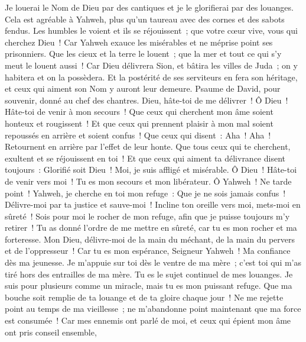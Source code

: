 \begin{multicols}{2}
Je louerai le Nom de Dieu par des cantiques et je le glorifierai par des louanges.
Cela est agréable à Yahweh, plus qu'un taureau avec des cornes et des sabots fendus.
Les humbles le voient et ils se réjouissent~; que votre cœur vive, vous qui cherchez Dieu~!
Car Yahweh exauce les misérables et ne méprise point ses prisonniers.
Que les cieux et la terre le louent~; que la mer et tout ce qui s'y meut le louent aussi~!
Car Dieu délivrera Sion, et bâtira les villes de Juda~; on y habitera et on la possèdera.
Et la postérité de ses serviteurs en fera son héritage, et ceux qui aiment son Nom y auront leur demeure.
\VerseOne{}Psaume de David, pour souvenir, donné au chef des chantres.
Dieu, hâte-toi de me délivrer~! Ô Dieu~! Hâte-toi de venir à mon secours~!
Que ceux qui cherchent mon âme soient honteux et rougissent~! Et que ceux qui prennent plaisir à mon mal soient repoussés en arrière et soient confus~!
Que ceux qui disent~: Aha~! Aha~! Retournent en arrière par l'effet de leur honte.
Que tous ceux qui te cherchent, exultent et se réjouissent en toi~! Et que ceux qui aiment ta délivrance disent toujours~: Glorifié soit Dieu~!
Moi, je suis affligé et misérable. Ô Dieu~! Hâte-toi de venir vers moi~! Tu es mon secours et mon libérateur. Ô Yahweh~! Ne tarde point~!
\VerseOne{}Yahweh, je cherche en toi mon refuge~: Que je ne sois jamais confus~!
Délivre-moi par ta justice et sauve-moi~! Incline ton oreille vers moi, mets-moi en sûreté~!
Sois pour moi le rocher de mon refuge, afin que je puisse toujours m'y retirer~! Tu as donné l'ordre de me mettre en sûreté, car tu es mon rocher et ma forteresse.
Mon Dieu, délivre-moi de la main du méchant, de la main du pervers et de l'oppresseur~!
Car tu es mon espérance, Seigneur Yahweh~! Ma confiance dès ma jeunesse.
Je m'appuie sur toi dès le ventre de ma mère~; c'est toi qui m'as tiré hors des entrailles de ma mère. Tu es le sujet continuel de mes louanges.
Je suis pour plusieurs comme un miracle, mais tu es mon puissant refuge.
Que ma bouche soit remplie de ta louange et de ta gloire chaque jour~!
Ne me rejette point au temps de ma vieillesse~; ne m'abandonne point maintenant que ma force est consumée~!
Car mes ennemis ont parlé de moi, et ceux qui épient mon âme ont pris conseil ensemble,

\end{multicols}

